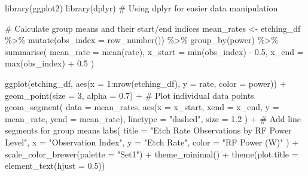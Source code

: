 \documentclass[
  letterpaper,
]{scrbook}
\newenvironment{Shaded}{\begin{snugshade}}{\end{snugshade}}
\newcommand{\AttributeTok}[1]{\textcolor[rgb]{0.40,0.45,0.13}{#1}}
\newcommand{\CommentTok}[1]{\textcolor[rgb]{0.37,0.37,0.37}{#1}}
\newcommand{\DecValTok}[1]{\textcolor[rgb]{0.68,0.00,0.00}{#1}}
\newcommand{\FloatTok}[1]{\textcolor[rgb]{0.68,0.00,0.00}{#1}}
\newcommand{\FunctionTok}[1]{\textcolor[rgb]{0.28,0.35,0.67}{#1}}
\newcommand{\NormalTok}[1]{\textcolor[rgb]{0.00,0.23,0.31}{#1}}
\newcommand{\OtherTok}[1]{\textcolor[rgb]{0.00,0.23,0.31}{#1}}
\newcommand{\SpecialCharTok}[1]{\textcolor[rgb]{0.37,0.37,0.37}{#1}}
\newcommand{\StringTok}[1]{\textcolor[rgb]{0.13,0.47,0.30}{#1}}
\begin{document}
\begin{Shaded}
\begin{Highlighting}[]
\FunctionTok{library}\NormalTok{(ggplot2)}
\FunctionTok{library}\NormalTok{(dplyr) }\CommentTok{\# Using dplyr for easier data manipulation}

\CommentTok{\# Calculate group means and their start/end indices}
\NormalTok{mean\_rates }\OtherTok{\textless{}{-}}\NormalTok{ etching\_df }\SpecialCharTok{\%\textgreater{}\%}
  \FunctionTok{mutate}\NormalTok{(}\AttributeTok{obs\_index =} \FunctionTok{row\_number}\NormalTok{()) }\SpecialCharTok{\%\textgreater{}\%}
  \FunctionTok{group\_by}\NormalTok{(power) }\SpecialCharTok{\%\textgreater{}\%}
  \FunctionTok{summarise}\NormalTok{(}
    \AttributeTok{mean\_rate =} \FunctionTok{mean}\NormalTok{(rate),}
    \AttributeTok{x\_start =} \FunctionTok{min}\NormalTok{(obs\_index) }\SpecialCharTok{{-}} \FloatTok{0.5}\NormalTok{,}
    \AttributeTok{x\_end =} \FunctionTok{max}\NormalTok{(obs\_index) }\SpecialCharTok{+} \FloatTok{0.5}
\NormalTok{  )}

\FunctionTok{ggplot}\NormalTok{(etching\_df, }\FunctionTok{aes}\NormalTok{(}\AttributeTok{x =} \DecValTok{1}\SpecialCharTok{:}\FunctionTok{nrow}\NormalTok{(etching\_df), }\AttributeTok{y =}\NormalTok{ rate, }\AttributeTok{color =}\NormalTok{ power)) }\SpecialCharTok{+}
  \FunctionTok{geom\_point}\NormalTok{(}\AttributeTok{size =} \DecValTok{3}\NormalTok{, }\AttributeTok{alpha =} \FloatTok{0.7}\NormalTok{) }\SpecialCharTok{+} \CommentTok{\# Plot individual data points}
  \FunctionTok{geom\_segment}\NormalTok{(}
    \AttributeTok{data =}\NormalTok{ mean\_rates, }
    \FunctionTok{aes}\NormalTok{(}\AttributeTok{x =}\NormalTok{ x\_start, }\AttributeTok{xend =}\NormalTok{ x\_end, }\AttributeTok{y =}\NormalTok{ mean\_rate, }\AttributeTok{yend =}\NormalTok{ mean\_rate),}
    \AttributeTok{linetype =} \StringTok{"dashed"}\NormalTok{, }
    \AttributeTok{size =} \FloatTok{1.2}
\NormalTok{  ) }\SpecialCharTok{+} \CommentTok{\# Add line segments for group means}
  \FunctionTok{labs}\NormalTok{(}
    \AttributeTok{title =} \StringTok{"Etch Rate Observations by RF Power Level"}\NormalTok{,}
    \AttributeTok{x =} \StringTok{"Observation Index"}\NormalTok{,}
    \AttributeTok{y =} \StringTok{"Etch Rate"}\NormalTok{,}
    \AttributeTok{color =} \StringTok{"RF Power (W)"}
\NormalTok{  ) }\SpecialCharTok{+}
  \FunctionTok{scale\_color\_brewer}\NormalTok{(}\AttributeTok{palette =} \StringTok{"Set1"}\NormalTok{) }\SpecialCharTok{+}
  \FunctionTok{theme\_minimal}\NormalTok{() }\SpecialCharTok{+}
  \FunctionTok{theme}\NormalTok{(}\AttributeTok{plot.title =} \FunctionTok{element\_text}\NormalTok{(}\AttributeTok{hjust =} \FloatTok{0.5}\NormalTok{))}
\end{Highlighting}
\end{Shaded}
\end{document}
